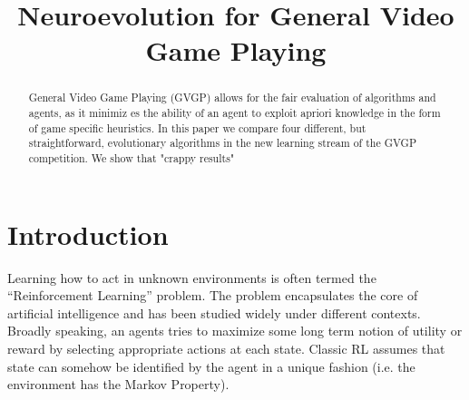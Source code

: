 \documentclass[conference]{IEEEtran}
\begin{document}
%
\title{Neuroevolution for General Video Game Playing}

\author{
}


\maketitle


\begin{abstract}
General Video Game Playing (GVGP) allows for the fair evaluation of algorithms and agents, as it minimiz es the ability of an agent to exploit apriori knowledge in the form of game specific heuristics. In this paper we compare four different, but straightforward, evolutionary algorithms in the new learning stream of the GVGP competition. We show that "crappy results"
\end{abstract}

\IEEEpeerreviewmaketitle

\section{Introduction} \label{sec:intro}



Learning how to act in unknown environments is often termed the ``Reinforcement Learning'' problem\cite{RL}. The problem encapsulates the core of artificial intelligence and has been studied widely under different contexts. Broadly speaking, an agents tries to maximize some long term notion of utility or reward by selecting appropriate actions at each state. Classic RL assumes that state can somehow be identified by the agent in a unique fashion (i.e. the environment has the Markov Property). 
\end{document}
